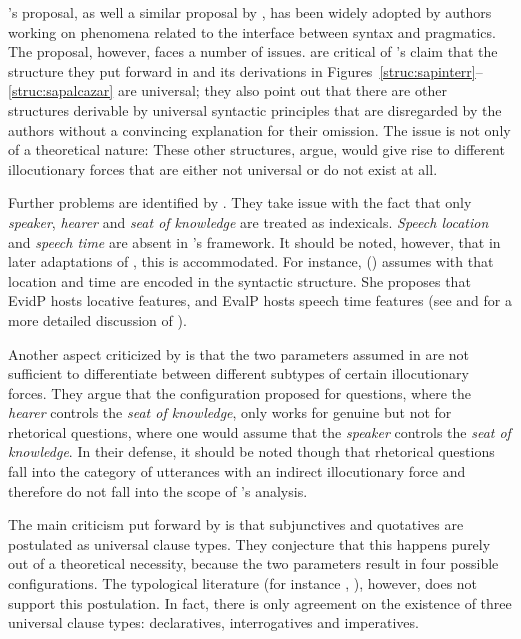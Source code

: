 \citeauthor{SpeasTenny2003}'s proposal, as well a similar proposal by \citet{Haegeman2014},   has been widely adopted
by authors working on  phenomena related to the interface between syntax and pragmatics. The proposal,
however,  faces a number of issues. \citet{Gaertner2006}  are critical of \citeauthor{SpeasTenny2003}'s claim that the structure they put forward in  and its derivations in Figures~\ref{struc:sapinterr}--\ref{struc:sapalcazar} are universal; they also  point out that there are other structures
derivable by universal syntactic principles that are disregarded by the authors without
a convincing explanation for their omission. The issue is not only of a theoretical nature: These other
structures, \citet{Gaertner2006} argue, would give rise to different illocutionary
forces that are either not universal or do not exist at all.

Further problems are identified by \citet{Alcazar2014}. They take issue with the fact that only \emph{speaker}, \emph{hearer} and \emph{seat of knowledge} are treated as indexicals.
\emph{Speech location} and \emph{speech time} are absent in \citeauthor{SpeasTenny2003}'s framework. It should be noted, however, that
in later adaptations of \citet{SpeasTenny2003}, this is accommodated. For instance, \citeauthor{Corr2016} (\citeyear[193--194]{Corr2016})  assumes with \citet{Sigurdsson2010} that location and time are encoded
in the syntactic structure. She proposes that EvidP hosts locative features, and EvalP hosts
speech time features (see   and  for a more detailed discussion of \citealt{Corr2016}).


Another aspect criticized by \citet{Alcazar2014} is that the two parameters assumed in \citet{SpeasTenny2003} are
not sufficient to differentiate between different subtypes of certain illocutionary forces.
They argue that the configuration proposed for questions, where the \emph{hearer} controls the \emph{seat
of knowledge}, only works for genuine but not for rhetorical questions, where one would
assume that the \emph{speaker} controls the \emph{seat of knowledge}. In their defense, it  should be noted though that  rhetorical questions fall into the category of utterances with an indirect illocutionary force and
therefore do not fall into the scope of \citeauthor{SpeasTenny2003}'s analysis.

The main criticism put forward by \citet{Alcazar2014} is that subjunctives and quotatives
are postulated as universal clause types. They conjecture that this happens purely out of a theoretical necessity, because the
two parameters result in four possible configurations. The typological literature (for instance \citealt{Sadock1985}, \citealt{Koenig2007}), however, does not support this postulation. In fact,
there is only agreement on the existence of three universal clause types: declaratives,
interrogatives and imperatives.

